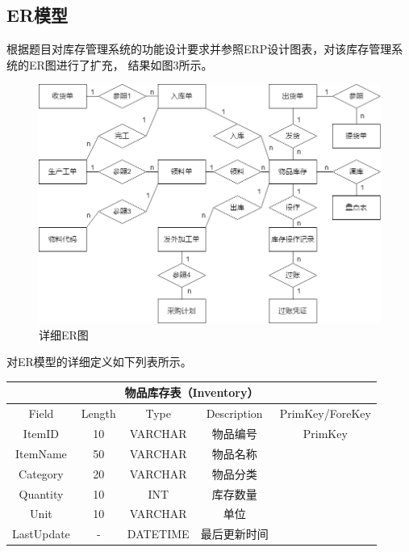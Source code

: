 \documentclass[12pt,a4paper]{article}
\begin{document}
\subsection{ER模型}
根据题目对库存管理系统的功能设计要求并参照ERP设计图表，对该库存管理系统的ER图进行了扩充，
结果如图3所示。
\begin{figure}[h]
    \centering
    \includegraphics[scale=0.5]{fig3.png}
    \caption{详细ER图}
    \label{fig:3}
\end{figure}

对ER模型的详细定义如下列表所示。
\begin{table}[h]
    \centering
    \begin{tabular}{|c|c|c|c|c|} 
     \hline
     \multicolumn{5}{|c|}{物品库存表（Inventory）}\\
     \hline
     Field & Length & Type & Description & PrimKey/ForeKey\\\hline
        ItemID      & 10     & VARCHAR & 物品编号          & PrimKey         \\ \hline
        ItemName    & 50     & VARCHAR & 物品名称          &                 \\ \hline
        Category    & 20     & VARCHAR & 物品分类          &                 \\ \hline
        Quantity    & 10     & INT     & 库存数量          &                 \\ \hline
        Unit        & 10     & VARCHAR & 单位              &                 \\ \hline
        LastUpdate  & -      & DATETIME& 最后更新时间      &                 \\ \hline   
    \end{tabular}
    \label{table:1}
\end{table}
\end{document}
